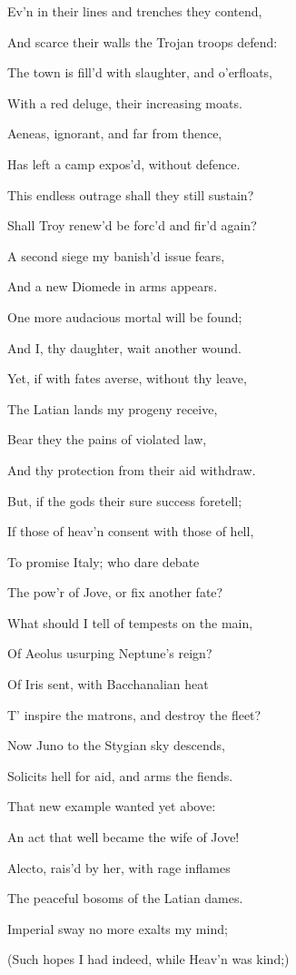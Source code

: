 Ev’n in their lines and trenches they contend,

And scarce their walls the Trojan troops defend:

The town is fill’d with slaughter, and o’erfloats,

With a red deluge, their increasing moats.

Aeneas, ignorant, and far from thence,

Has left a camp expos’d, without defence.

This endless outrage shall they still sustain?

Shall Troy renew’d be forc’d and fir’d again?

A second siege my banish’d issue fears,

And a new Diomede in arms appears.

One more audacious mortal will be found;

And I, thy daughter, wait another wound.

Yet, if with fates averse, without thy leave,

The Latian lands my progeny receive,

Bear they the pains of violated law,

And thy protection from their aid withdraw.

But, if the gods their sure success foretell;

If those of heav’n consent with those of hell,

To promise Italy; who dare debate

The pow’r of Jove, or fix another fate?

What should I tell of tempests on the main,

Of Aeolus usurping Neptune’s reign?

Of Iris sent, with Bacchanalian heat

T’ inspire the matrons, and destroy the fleet?

Now Juno to the Stygian sky descends,

Solicits hell for aid, and arms the fiends.

That new example wanted yet above:

An act that well became the wife of Jove!

Alecto, rais’d by her, with rage inflames

The peaceful bosoms of the Latian dames.

Imperial sway no more exalts my mind;

(Such hopes I had indeed, while Heav’n was kind;)

